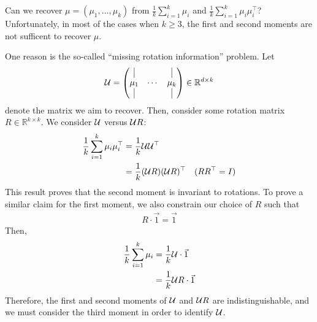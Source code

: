 Can we recover $\mu=(\mu_1,...,\mu_k)$ from $\frac{1}{k}\sum_{i=1}^k\mu_i$ and $\frac{1}{k}\sum_{i=1}^k\mu_i\mu_i^\top$? Unfortunately, in most of the cases when $k\geq 3$, the first and second moments are not sufficent to recover $\mu$. 

One reason is the so-called ``missing rotation information'' problem. Let 
\begin{equation}
    \cU =\begin{pmatrix} \vrule & & \vrule \\ \mu_1 & \cdots & \mu_k \\ \vrule & & \vrule \end{pmatrix} \in\mathbb{R}^{d\times k}
\end{equation}
denote the matrix we aim to recover. Then, consider some rotation matrix $R\in\mathbb{R}^{k\times k}$. We consider $\mathcal U$ versus $\mathcal U R$:
\begin{align}
    \frac{1}{k}\sum_{i=1}^k\mu_i\mu_i^\top &= \frac{1}{k}\mathcal U \mathcal U^\top \\
    &=\frac{1}{k}(\mathcal U R)(\mathcal U R)^\top &\text{($RR^\top=I$)}
\end{align}
This result proves that the second moment is invariant to rotations. To prove a similar claim for the first moment, we also constrain our choice of $R$ such that
\begin{align}
    R\cdot\Vec{1}=\Vec{1}
\end{align}
Then,
\begin{align}
    \frac{1}{k}\sum_{i=1}^k\mu_i&=\frac{1}{k} \mathcal U \cdot\Vec{1} \\
    &=\frac{1}{k} \mathcal U R\cdot\Vec{1}
\end{align}
Therefore, the first and second moments of $\mathcal U$ and $\mathcal U R$ are indistinguishable, and we must consider the third moment in order to identify $\mathcal U$.